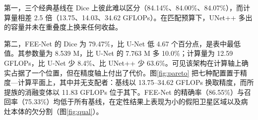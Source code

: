 \documentclass[conference]{IEEEtran}
\begin{document}
\begin{table}[t]
\centering
\footnotesize
\caption{表2 150 帧独立测试划分上的分割性能。所有行共享同一划分、增强、60 轮预算与损失族；数值为固定种子下的单次点估计。FLOPs 为 256$\times$256、批大小 1 下的 ThOP 统计；延迟与 FPS 为单台设备上的 CUDA 事件测量（第4.3 节）。加粗为各列最优。}
\label{tab:main}
\end{table}

第一，三个经典基线在 Dice 上彼此难以区分（84.14\%、84.00\%、84.07\%），而计算量相差 2.5 倍（13.75、14.03、34.62 GFLOPs）。在匹配预算下，UNet++ 多出的容量并未在重叠度上换来任何收益。

第二，FEE-Net 的 Dice 为 79.47\%，比 U-Net 低 4.67 个百分点，是表中最低值。其参数量为 8.539 M，比 U-Net 的 7.763 M 多 10.0\%；计算量为 12.59 GFLOPs，比 U-Net 少 8.4\%、比 UNet++ 少 63.6\%。可见该架构在计算轴上确实占据了一个位置，但在精度轴上付出了代价。图\ref{fig:pareto} 把七种配置置于精度—计算平面上，其中并无支配者：基线以 13.75–34.62 GFLOPs 换取精度，而所提族的消融变体以 11.83 GFLOPs 位于其下。FEE-Net 的精确率（86.55\%）与召回率（75.33\%）均低于所有基线，在定性结果上表现为小的假阳卫星区域以及病灶本体的欠分割（图\ref{fig:qual}）。
\end{document}
